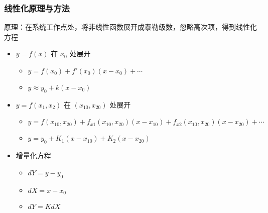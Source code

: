 \documentclass{beamer}
\begin{document}
\begin{frame}
\frametitle{线性化原理与方法}
\label{sec-1-3}

原理：在系统工作点处，将非线性函数展开成泰勒级数，忽略高次项，得到线性化方程
\begin{itemize}
\item <2->$y=f(x)$ 在 $x_0$ 处展开
\begin{itemize}
\item <3->$y =f(x_0)+f'(x_0)(x-x_0)+\cdots$
\item <3->$y \approx   y_0 + k(x-x_0)$
\end{itemize}
\item <4->$y=f(x_1,x_2)$ 在 $(x_{10},x_{20})$ 处展开
\begin{itemize}
\item <5->$y = f(x_{10},x_{20})+f_{x1}(x_{10},x_{20})(x-x_{10})+f_{x2}(x_{10},x_{20})(x-x_{20})+\cdots$
\item <5->$y = y_0+K_1(x-x_{10})+K_2(x-x_{20})$
\end{itemize}
\item <6-> 增量化方程
\begin{itemize}
\item <7-> $dY=y-y_0$
\item <7-> $dX=x-x_0$
\item <8-> $dY=K dX$
\end{itemize}
\end{itemize}
\end{frame}
\end{document}
